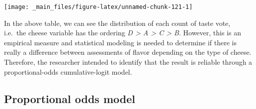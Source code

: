 \documentclass[]{book}
\newenvironment{Shaded}{\begin{snugshade}}{\end{snugshade}}
\newcommand{\ControlFlowTok}[1]{\textcolor[rgb]{0.13,0.29,0.53}{\textbf{#1}}}
\newcommand{\DataTypeTok}[1]{\textcolor[rgb]{0.13,0.29,0.53}{#1}}
\newcommand{\DecValTok}[1]{\textcolor[rgb]{0.00,0.00,0.81}{#1}}
\newcommand{\KeywordTok}[1]{\textcolor[rgb]{0.13,0.29,0.53}{\textbf{#1}}}
\newcommand{\NormalTok}[1]{#1}
\newcommand{\OperatorTok}[1]{\textcolor[rgb]{0.81,0.36,0.00}{\textbf{#1}}}
\newcommand{\OtherTok}[1]{\textcolor[rgb]{0.56,0.35,0.01}{#1}}
\newcommand{\StringTok}[1]{\textcolor[rgb]{0.31,0.60,0.02}{#1}}
\begin{document}
\begin{Shaded}
\end{Shaded}

\begin{center}\texttt{[image: \_main\_files/figure-latex/unnamed-chunk-121-1]} \end{center}

In the above table, we can see the distribution of each count of taste vote, i.e.~the cheese variable has the ordering \emph{D \textgreater{} A \textgreater{} C \textgreater{} B}. However, this is an empirical measure and statistical modeling is needed to determine if there is really a difference between assessments of flavor depending on the type of cheese. Therefore, the researcher intended to identify that the result is reliable through a proportional-odds cumulative-logit model.

\hypertarget{proportional-odds-model-1}{%
\subsection{Proportional odds model}\label{proportional-odds-model-1}}

\begin{Shaded}
\end{Shaded}
\end{document}
